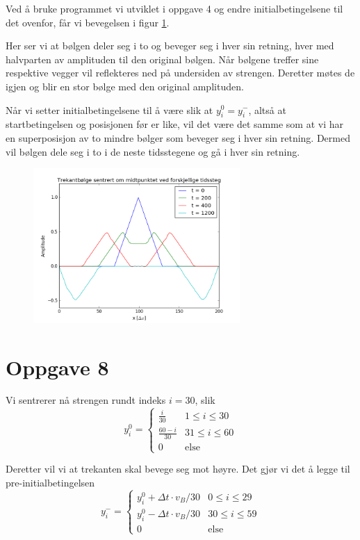 \documentclass[norsk,a4,12pt,fleqn]{extarticle}
\begin{document}
Ved å bruke programmet vi utviklet
i oppgave 4 og endre initialbetingelsene
til det ovenfor, får vi bevegelsen
i figur \ref{fig:prob7}.

Her ser vi at bølgen deler seg i to
og beveger seg i hver sin retning,
hver med halvparten av amplituden til
den original bølgen.
Når bølgene treffer sine respektive
vegger vil reflekteres ned på undersiden
av strengen. Deretter møtes de igjen
og blir en stor bølge med
den original amplituden.

Når vi setter initialbetingelsene
til å være slik at $y_i^0 = y_i^-$,
altså at startbetingelsen og
posisjonen før er like, vil det
være det samme som at vi har en superposisjon
av to mindre bølger som beveger seg i hver sin retning.
Dermed vil bølgen dele seg i to i de
neste tidsstegene og gå i hver sin retning.

\begin{figure}[H]
    \label{fig:prob7}
    \centering %
    \includegraphics[width=0.7\textwidth]{../src/problem7.png}
    \caption{} 
\end{figure} 


\section*{Oppgave 8}
Vi sentrerer nå strengen rundt indeks $i=30$, slik
\begin{equation}
y_i^0 =
\begin{cases}
\frac{i}{30} & 1 \leq i \leq 30\\
\frac{60-i}{30} & 31 \leq i \leq 60\\
0 & \text{else}
\end{cases}
\end{equation}

Deretter vil vi at trekanten skal bevege seg mot høyre.
Det gjør vi det å legge til pre-initialbetingelsen
\begin{equation}
y_i^- =
\begin{cases}
y_i^0+\Delta t\cdot v_B/30 & 0 \leq i \leq 29\\
y_i^0-\Delta t\cdot v_B/30 & 30 \leq i \leq 59\\
0 & \text{else}
\end{cases}
\end{equation}
\end{document}
